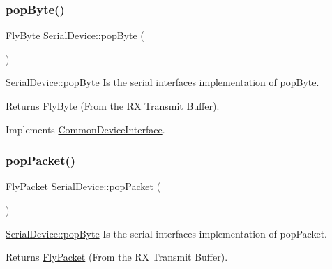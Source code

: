 \hypertarget{class_serial_device_aa48df17f28ab9f613ba07181487a39c9}{}\label{class_serial_device_aa48df17f28ab9f613ba07181487a39c9} 
\subsubsection{\texorpdfstring{pop\+Byte()}{popByte()}}
{\footnotesize\ttfamily Fly\+Byte Serial\+Device\+::pop\+Byte (\begin{DoxyParamCaption}{ }\end{DoxyParamCaption})\hspace{0.3cm}{\ttfamily [virtual]}}



\hyperlink{class_serial_device_aa48df17f28ab9f613ba07181487a39c9}{Serial\+Device\+::pop\+Byte} Is the serial interface\textquotesingle{}s implementation of pop\+Byte. 

\begin{DoxyReturn}{Returns}
Fly\+Byte (From the RX Transmit Buffer). 
\end{DoxyReturn}


Implements \hyperlink{class_common_device_interface}{Common\+Device\+Interface}.

\hypertarget{class_serial_device_ac581710eb5e03945d9b3de9d39be51fc}{}\label{class_serial_device_ac581710eb5e03945d9b3de9d39be51fc} 
\subsubsection{\texorpdfstring{pop\+Packet()}{popPacket()}}
{\footnotesize\ttfamily \hyperlink{class_fly_packet}{Fly\+Packet} Serial\+Device\+::pop\+Packet (\begin{DoxyParamCaption}{ }\end{DoxyParamCaption})\hspace{0.3cm}{\ttfamily [virtual]}}



\hyperlink{class_serial_device_aa48df17f28ab9f613ba07181487a39c9}{Serial\+Device\+::pop\+Byte} Is the serial interface\textquotesingle{}s implementation of pop\+Packet. 

\begin{DoxyReturn}{Returns}
\hyperlink{class_fly_packet}{Fly\+Packet} (From the RX Transmit Buffer). 
\end{DoxyReturn}


